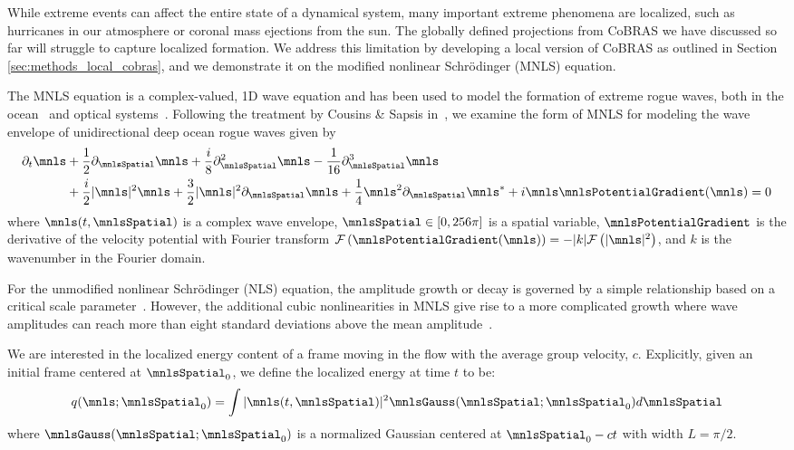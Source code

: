 \documentclass[twocolumn,10pt]{article}
\begin{document}
While extreme events can affect the entire state of a dynamical system, many important extreme phenomena are localized, such as hurricanes in our atmosphere or coronal mass ejections from the sun. 
The globally defined projections from CoBRAS we have discussed so far will struggle to capture localized formation. We address this limitation by developing a local version of CoBRAS as outlined in Section \ref{sec:methods_local_cobras}, and we demonstrate it on the modified nonlinear Schr{\"o}dinger (MNLS) equation. 


The MNLS equation is a complex-valued, 1D wave equation and has been used to model the formation of extreme rogue waves, both in the ocean~\cite{dysthe2008a} and optical systems~\cite{solli2007optical}.
Following the treatment by Cousins \& Sapsis in~\cite{cousins2016a}, we examine the form of MNLS for modeling the wave envelope of unidirectional deep ocean rogue waves given by
%
\begin{align}
    \partial_{t}\mnls
    &+ \frac{1}{2}\partial_\mnlsSpatial \mnls
    + \frac{i}{8}\partial^2_{\mnlsSpatial}\mnls 
    - \frac{1}{16}\partial^3_{\mnlsSpatial}\mnls
    \\ \nonumber
    &+ \frac{i}{2}|\mnls|^2 \mnls 
    + \frac{3}{2} |\mnls|^2 \partial_\mnlsSpatial\mnls
    + \frac{1}{4} \mnls^2 \partial_\mnlsSpatial\mnls^*
    + i \mnls \mnlsPotentialGradient(\mnls) 
    =0
\end{align}
where $\mnls(t,\mnlsSpatial)$ is a complex wave envelope, ${\mnlsSpatial \in [0, 256\pi]}$ is a spatial variable, 
$\mnlsPotentialGradient$ is the derivative of the velocity potential with Fourier transform 
${\mathcal F \left(\mnlsPotentialGradient(\mnls)\right)
    = -|k| \mathcal F \left( |\mnls|^2 \right)}$, and $k$ is the wavenumber in the Fourier domain. 

For the unmodified nonlinear Schr{\"o}dinger (NLS) equation, the amplitude growth or decay is governed by a simple relationship based on a critical scale parameter~\cite{cousins2015a, cousins2016a}. However, the additional cubic nonlinearities in MNLS give rise to a  more complicated growth where wave amplitudes can reach more than eight standard deviations above the mean amplitude~\cite{onorato2005modulational,dysthe2008a}.

We are interested in the localized energy content of a frame moving in the flow with the average group velocity, $c$. Explicitly, given an initial frame centered at $\mnlsSpatial_0$, we define the localized energy at time $t$ to be:
%
\begin{equation}\label{mnlsQOI}
    q(\mnls;\mnlsSpatial_0) = \int |\mnls(t,\mnlsSpatial)|^2 \mnlsGauss(\mnlsSpatial; \mnlsSpatial_0) d\mnlsSpatial
\end{equation}
where $\mnlsGauss(\mnlsSpatial; \mnlsSpatial_0)$
is a normalized Gaussian centered at $\mnlsSpatial_0 - ct$ with width $L=\pi/2$. 
%
\end{document}
